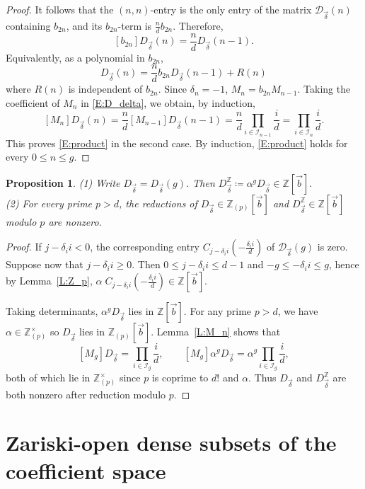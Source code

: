 \documentclass{amsart}
\theoremstyle{plain}
\newtheorem{prop}[theorem]{Proposition}
\theoremstyle{remark}
\newcommand{\cI}{\mathcal{I}}
\newcommand{\cD}{\mathcal{D}}
\newcommand{\1}{\mathbf{1}}
\newcommand{\Z}{\mathbb{Z}}
\newcommand{\vb}{{\vec{b}}}
\newcommand{\bdelta}{{\vec\delta}}
\begin{document}
\begin{proof}
It follows that the $(n,n)$-entry is the only entry of the matrix
$\cD_\bdelta(n)$ containing $b_{2n}$, and its $b_{2n}$-term is
$\frac{n}{d}b_{2n}$.
Therefore,
\[
[b_{2n}]D_\bdelta(n)=\frac{n}{d}D_\bdelta(n-1).
\]
Equivalently, as a polynomial in $b_{2n}$,
\begin{equation}\label{E:D_delta}
D_\bdelta(n)=\frac{n}{d}b_{2n}D_\bdelta(n-1)+R(n)
\end{equation}
where $R(n)$ is independent of $b_{2n}$.
Since $\delta_n=-1$,
$M_n=b_{2n}M_{n-1}$.
Taking the coefficient of $M_n$ in \eqref{E:D_delta},
we obtain, by induction,
\[
[M_n]D_\bdelta(n)=\frac{n}{d}[M_{n-1}]D_\bdelta(n-1)
=\frac{n}{d}\prod_{i\in\cI_{n-1}}\frac{i}{d}
=\prod_{i\in \cI_n}\frac{i}{d}.
\]
This proves \eqref{E:product} in the second case.
By induction, \eqref{E:product} holds for every $0\le n\le g$.
\end{proof}


\begin{prop}\label{P:nonzero}
(1) Write $D_\bdelta=D_\bdelta(g)$. Then
$
D_\bdelta^\Z\coloneqq \alpha^g D_\bdelta
\in \Z[\vb].
$
\\
(2)
For every prime $p>d$, the reductions of $D_\bdelta\in\Z_{(p)}[\vb]$ and $D_\bdelta^\Z\in\Z[\vb]$ modulo $p$ are nonzero.
\end{prop}

\begin{proof}
If $j-\delta_i i <0$, the corresponding entry
$C_{j-\delta_i i}(-\frac{\delta_i i}{d})$
of $\cD_{\bdelta}(g)$
is zero.
Suppose now that $j-\delta_i i\ge 0$.
Then $0\le j-\delta_i i \le d-1$ and $-g\le -\delta_i i\le g$,
hence by Lemma~\ref{L:Z_p},
$ \alpha\; C_{j-\delta_i i}(-\frac{\delta_i i}{d}) \in\Z[\vb]$.

Taking determinants, $\alpha^g D_\bdelta$ lies in $\Z[\vb]$.
For any prime $p>d$, we have $\alpha\in\Z_{(p)}^\times$ so
$D_\bdelta$ lies in $\Z_{(p)}[\vb]$.
Lemma~\ref{L:M_n} shows that
\[
[M_g]D_\bdelta
=\prod_{i\in\cI_g}\frac{i}{d}, \qquad
[M_g]\alpha^g D_\bdelta
=\alpha^g\prod_{i\in\cI_g}\frac{i}{d},
\]
both of which lie in $\Z_{(p)}^\times$
since $p$ is coprime to $d!$ and $\alpha$.
Thus $D_{\bdelta}$ and $D_{\bdelta}^\Z$ are both nonzero after reduction modulo $p$.
\end{proof}


\section{Zariski-open dense subsets of the coefficient space}
\label{S:3}
\end{document}
